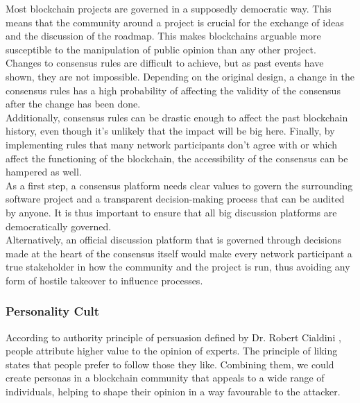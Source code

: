 \documentclass[12pt,a4paper]{article}
\begin{document}
Most blockchain projects are governed in a supposedly democratic way. This means that the community around a project is crucial for the exchange of ideas and the discussion of the roadmap. This makes \gls{blockchain}s arguable more susceptible to the manipulation of public opinion than any other project.\\

Changes to consensus rules are difficult to achieve, but as past events have shown, they are not impossible. Depending on the original design, a change in the consensus rules has a high probability of affecting the validity of the consensus after the change has been done.\\

Additionally, consensus rules can be drastic enough to affect the past blockchain history, even though it's unlikely that the impact will be big here. Finally, by implementing rules that many network participants don't agree with or which affect the functioning of the \gls{blockchain}, the accessibility of the consensus can be hampered as well.\\

As a first step, a consensus platform needs clear values to govern the surrounding software project and a transparent decision-making process that can be audited by anyone. It is thus important to ensure that all big discussion platforms are democratically governed.\\

Alternatively, an official discussion platform that is governed through decisions made at the heart of the consensus itself would make every network participant a true stakeholder in how the community and the project is run, thus avoiding any form of hostile takeover to influence processes.\\

\subsubsection{Personality Cult}

According to authority principle of persuasion defined by Dr. Robert Cialdini \cite{influence}, people attribute higher value to the opinion of experts. The principle of liking states that people prefer to follow those they like. Combining them, we could create personas in a blockchain community that appeals to a wide range of individuals, helping to shape their opinion in a way favourable to the attacker.\\
\end{document}
